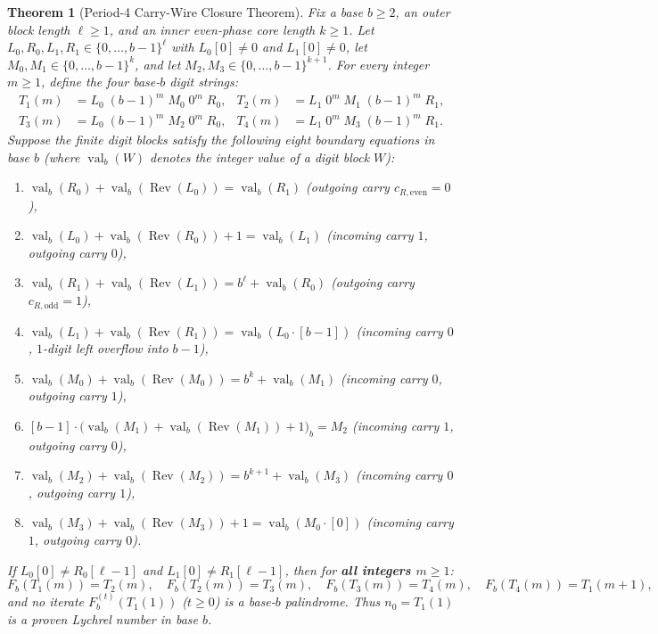 \documentclass[11pt,a4paper]{article}
\newtheorem{theorem}{Theorem}
\theoremstyle{definition}
\theoremstyle{remark}
\begin{document}
\begin{theorem}[Period-4 Carry-Wire Closure Theorem]
\label{thm:closure}
Fix a base $b \ge 2$, an outer block length $\ell \ge 1$, and an inner even-phase core length $k \ge 1$. Let $L_0, R_0, L_1, R_1 \in \{0, \dots, b-1\}^\ell$ with $L_0[0] \neq 0$ and $L_1[0] \neq 0$, let $M_0, M_1 \in \{0, \dots, b-1\}^k$, and let $M_2, M_3 \in \{0, \dots, b-1\}^{k+1}$. For every integer $m \ge 1$, define the four base-$b$ digit strings:
\begin{align}
  T_1(m) &= L_0 \; (b-1)^m \; M_0 \; 0^m \; R_0, & T_2(m) &= L_1 \; 0^m \; M_1 \; (b-1)^m \; R_1, \label{eq:T12}\\
  T_3(m) &= L_0 \; (b-1)^m \; M_2 \; 0^m \; R_0, & T_4(m) &= L_1 \; 0^m \; M_3 \; (b-1)^m \; R_1. \label{eq:T34}
\end{align}
Suppose the finite digit blocks satisfy the following eight boundary equations in base $b$ (where $\operatorname{val}_b(W)$ denotes the integer value of a digit block $W$):
\begin{enumerate}
  \item $\operatorname{val}_b(R_0) + \operatorname{val}_b(\operatorname{Rev}(L_0)) = \operatorname{val}_b(R_1)$ \quad (outgoing carry $c_{R,\mathrm{even}} = 0$),
  \item $\operatorname{val}_b(L_0) + \operatorname{val}_b(\operatorname{Rev}(R_0)) + 1 = \operatorname{val}_b(L_1)$ \quad (incoming carry $1$, outgoing carry $0$),
  \item $\operatorname{val}_b(R_1) + \operatorname{val}_b(\operatorname{Rev}(L_1)) = b^\ell + \operatorname{val}_b(R_0)$ \quad (outgoing carry $c_{R,\mathrm{odd}} = 1$),
  \item $\operatorname{val}_b(L_1) + \operatorname{val}_b(\operatorname{Rev}(R_1)) = \operatorname{val}_b(L_0 \cdot [b-1])$ \quad (incoming carry $0$, $1$-digit left overflow into $b-1$),
  \item $\operatorname{val}_b(M_0) + \operatorname{val}_b(\operatorname{Rev}(M_0)) = b^k + \operatorname{val}_b(M_1)$ \quad (incoming carry $0$, outgoing carry $1$),
  \item $[b-1] \cdot \bigl(\operatorname{val}_b(M_1) + \operatorname{val}_b(\operatorname{Rev}(M_1)) + 1\bigr)_b = M_2$ \quad (incoming carry $1$, outgoing carry $0$),
  \item $\operatorname{val}_b(M_2) + \operatorname{val}_b(\operatorname{Rev}(M_2)) = b^{k+1} + \operatorname{val}_b(M_3)$ \quad (incoming carry $0$, outgoing carry $1$),
  \item $\operatorname{val}_b(M_3) + \operatorname{val}_b(\operatorname{Rev}(M_3)) + 1 = \operatorname{val}_b(M_0 \cdot [0])$ \quad (incoming carry $1$, outgoing carry $0$).
\end{enumerate}
If $L_0[0] \neq R_0[\ell-1]$ and $L_1[0] \neq R_1[\ell-1]$, then for \textbf{all integers $m \ge 1$}:
\[
  F_b(T_1(m)) = T_2(m), \quad F_b(T_2(m)) = T_3(m), \quad F_b(T_3(m)) = T_4(m), \quad F_b(T_4(m)) = T_1(m+1),
\]
and no iterate $F_b^{(t)}(T_1(1))$ ($t \ge 0$) is a base-$b$ palindrome. Thus $n_0 = T_1(1)$ is a proven Lychrel number in base $b$.
\end{theorem}
\end{document}
